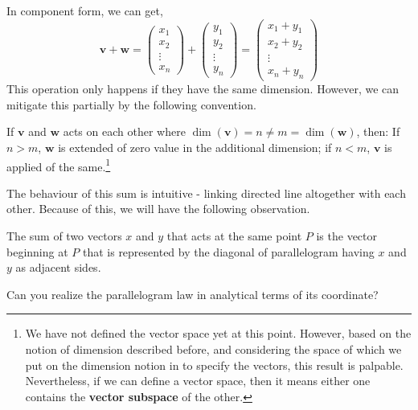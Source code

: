 In component form, we can get, 
\begin{equation}
    \mathbf{v} + \mathbf{w} = \begin{pmatrix}
        x_{1}\\
        x_{2}\\
        \vdots\\
        x_{n}
    \end{pmatrix}
    + \begin{pmatrix}
        y_{1}\\
        y_{2}\\
        \vdots\\
        y_{n}
    \end{pmatrix}
    =
    \begin{pmatrix}
        x_{1}+y_{1}\\
        x_{2}+y_{2}\\
        \vdots\\
        x_{n}+y_{n}
    \end{pmatrix}
\end{equation}
This operation only happens if they have the same dimension. However, we can mitigate this partially by the following convention. 
\begin{lemma}
    If $\mathbf{v}$ and $\mathbf{w}$ acts on each other where $\dim{(\mathbf{v})}=n\neq m = \dim{(\mathbf{w})}$, then: If $n>m$, $\mathbf{w}$ is extended of zero value in the additional dimension; if $n<m$, $\mathbf{v}$ is applied of the same.\footnote{We have not defined the vector space yet at this point. However, based on the notion of dimension described before, and considering the space of which we put on the dimension notion in to specify the vectors, this result is palpable. Nevertheless, if we can define a vector space, then it means either one contains the \textbf{vector subspace} of the other.}
\end{lemma}
The behaviour of this sum is intuitive - linking directed line altogether with each other. Because of this, we will have the following observation. 
\begin{theorem}
    The sum of two vectors $x$ and $y$ that acts at the same point $P$ is the vector beginning at $P$ that is represented by the diagonal of parallelogram having $x$ and $y$ as adjacent sides. 
\end{theorem}
\begin{question}
    Can you realize the parallelogram law in analytical terms of its coordinate?
\end{question}
